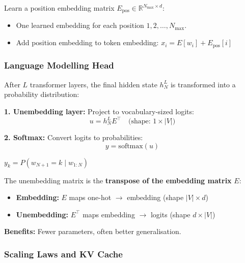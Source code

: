 \begin{defbox}
Learn a position embedding matrix $E_{\text{pos}} \in \mathbb{R}^{N_{\max} \times d}$:
\begin{itemize}
  \item One learned embedding for each position $1, 2, \ldots, N_{\max}$.
  \item Add position embedding to token embedding: $x_i = E[w_i] + E_{\text{pos}}[i]$
\end{itemize}
\end{defbox}

\bigseparator

\subsubsection{Language Modelling Head}

\begin{defbox}
After $L$ transformer layers, the final hidden state $h^L_N$ is transformed into a probability distribution:

\textbf{1. Unembedding layer:} Project to vocabulary-sized logits:
\[
u = h^L_N E^\top \quad \text{(shape: } 1 \times |V| \text{)}
\]

\textbf{2. Softmax:} Convert logits to probabilities:
\[
y = \text{softmax}(u)
\]

$y_k = P(w_{N+1} = k \mid w_{1:N})$
\end{defbox}

\begin{defbox}
The unembedding matrix is the \textbf{transpose of the embedding matrix} $E$:
\begin{itemize}
  \item \textbf{Embedding:} $E$ maps one-hot $\to$ embedding (shape $|V| \times d$)
  \item \textbf{Unembedding:} $E^\top$ maps embedding $\to$ logits (shape $d \times |V|$)
\end{itemize}

\textbf{Benefits:} Fewer parameters, often better generalisation.
\end{defbox}

\bigseparator

\subsubsection{Scaling Laws and KV Cache}

